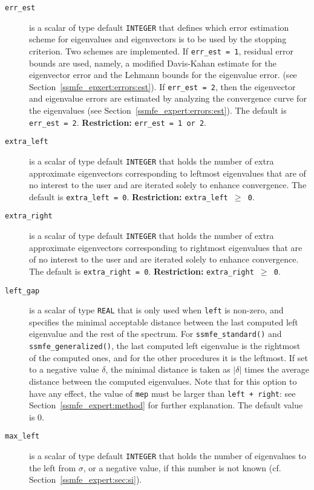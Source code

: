 \begin{description}
%
\item[\texttt{err\_est}] 
is a scalar of type default \texttt{INTEGER} that
defines which error estimation scheme 
for eigenvalues and eigenvectors
is to be used by the stopping criterion.
Two schemes are implemented.
If {\tt err\_est = 1}, residual error bounds are used,
namely,
a modified Davis-Kahan estimate for the eigenvector error
and
the Lehmann bounds for the eigenvalue error.
(see Section~\ref{ssmfe_epxert:errors:est}).
If {\tt err\_est = 2}, 
then the eigenvector and eigenvalue errors
are estimated by analyzing the convergence curve
for the eigenvalues (see Section~\ref{ssmfe_expert:errors:est}).
The default is {\tt err\_est = 2}.
{\bf Restriction:} {\tt err\_est = 1 {\rm or} 2}.
%
\item[\texttt{extra\_left}]
is a scalar of type default \texttt{INTEGER} that
holds the number of extra approximate eigenvectors
corresponding to leftmost eigenvalues
that are of no interest to the user
and are iterated solely to enhance convergence.
The default is {\tt extra\_left = 0}.
{\bf Restriction:} {\tt extra\_left $\ge$ 0}.
%
\item[\texttt{extra\_right}]
is a scalar of type default \texttt{INTEGER} that
holds the number of extra approximate eigenvectors
corresponding to rightmost eigenvalues
that are of no interest to the user
and are iterated solely to enhance convergence.
The default is {\tt extra\_right = 0}.
{\bf Restriction:} {\tt extra\_right $\ge$ 0}.
%
\item[\texttt{left\_gap}]
is a scalar of type \texttt{REAL}
that is only used when
{\tt left} is non-zero, and
specifies the minimal acceptable distance
between the last computed left eigenvalue
and the rest of the spectrum.
For {\tt ssmfe\_standard()} and {\tt ssmfe\_generalized()},
the last computed left eigenvalue
is the rightmost of the computed ones,
and for the other procedures
it is the leftmost.
If set to a negative value $\delta$,
the minimal distance is taken as
$|\delta|$ times the average distance between the computed eigenvalues.
Note that for this option to have any effect,
the value of {\tt mep} must be larger than
{\tt left + right}: see Section~\ref{ssmfe_expert:method}
for further explanation.
The default value is 0.
%
\item[\texttt{max\_left}]
is a scalar of type default \texttt{INTEGER} that
holds the number of eigenvalues to the left from $\sigma$,
or a negative value, if this number is not known
(cf. Section~\ref{ssmfe_expert:sec:si}).

\end{description}
